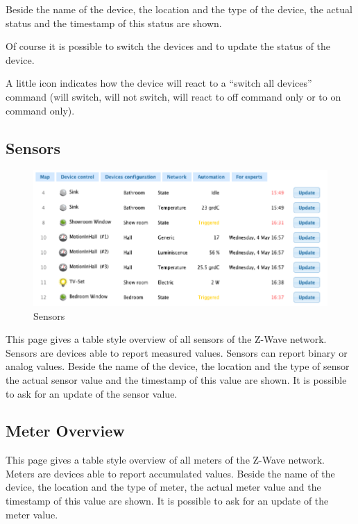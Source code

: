 Beside the name of the device, the location and the type of the device, the actual status and the 
timestamp of this status are shown.

Of course it is possible to switch the devices and to update the status of the device.

A little icon indicates how the device will react to a “switch all devices” command  
(will switch, will not switch, will react to off command only or to on command only).

\subsection{Sensors} 


\begin{figure} 
\begin{center}
\includegraphics[scale=0.7]{pics/sensors.png}
\caption{Sensors}
\end{center} 
\end{figure}

This page gives a table style overview of all sensors of the Z-Wave network.  
Sensors are devices able to report measured values. Sensors can report binary or analog values.  
Beside the name of the device, the location and the type of sensor the actual sensor value and 
the timestamp of this value are shown. It is possible to ask for an update of the sensor value.

\subsection{Meter Overview}

This page gives a table style overview of all meters of the Z-Wave network.  
Meters are devices able to report accumulated values.  Beside the name of the device, the location 
and the type of meter, the actual meter value and the timestamp of this value are shown. 
It is possible to ask for an update of the meter value.

